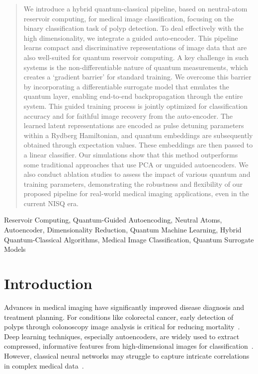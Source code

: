 \documentclass[conference]{IEEEtran}
\begin{document}
\begin{abstract}
We introduce a hybrid quantum-classical pipeline, based on neutral-atom reservoir computing, for medical image classification, focusing on the binary classification task of polyp detection. To deal effectively with the high dimensionality, we integrate a guided auto-encoder. This pipeline learns compact and discriminative representations of image data that are also well-suited for quantum reservoir computing. A key challenge in such systems is the non-differentiable nature of quantum measurements, which creates a `gradient barrier' for standard training. We overcome this barrier by incorporating a differentiable surrogate model that emulates the quantum layer, enabling end-to-end backpropagation through the entire system. This guided training process is jointly optimized for classification accuracy and for faithful image recovery from the auto-encoder. The learned latent representations are encoded as pulse detuning parameters within a Rydberg Hamiltonian, and quantum embeddings are subsequently obtained through expectation values. These embeddings are then passed to a linear classifier. Our simulations show that this method outperforms some traditional approaches that use PCA or unguided autoencoders. We also conduct ablation studies to assess the impact of various quantum and training parameters, demonstrating the robustness and flexibility of our proposed pipeline for real-world medical imaging applications, even in the current NISQ era.

\end{abstract}

\begin{IEEEkeywords}
Reservoir Computing, Quantum-Guided Autoencoding, Neutral Atoms, Autoencoder, Dimensionality Reduction, Quantum Machine Learning, Hybrid Quantum-Classical Algorithms, Medical Image Classification, Quantum Surrogate Models
\end{IEEEkeywords}


\section{Introduction}

Advances in medical imaging have significantly improved disease diagnosis and treatment planning. For conditions like colorectal cancer, early detection of polyps through colonoscopy image analysis is critical for reducing mortality~\cite{estevaGuideDeepLearning2019a}. Deep learning techniques, especially autoencoders, are widely used to extract compressed, informative features from high-dimensional images for classification~\cite{bengioLearningDeepArchitecturesa}. However, classical neural networks may struggle to capture intricate correlations in complex medical data~\cite{meiFrameworkProcessingLargescale2024}.
\end{document}
